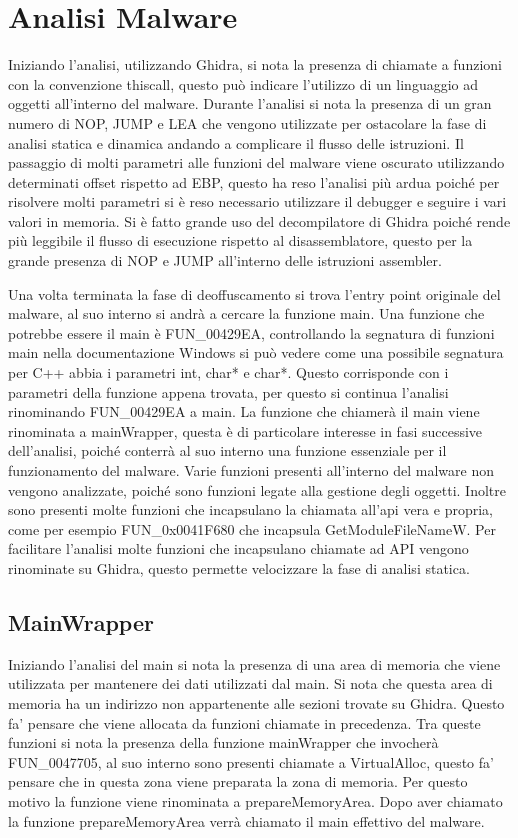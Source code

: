 \documentclass[a4paper,12pt]{article}
\begin{document}
\section{Analisi Malware}
Iniziando l'analisi, utilizzando Ghidra, si nota la presenza di chiamate a funzioni con la convenzione thiscall, questo può indicare l'utilizzo di un linguaggio ad oggetti all'interno del malware. Durante l'analisi si nota la presenza di un gran numero di NOP, JUMP e LEA che vengono utilizzate per ostacolare la fase di analisi statica e dinamica andando a complicare il flusso delle istruzioni. Il passaggio di molti parametri alle funzioni del malware viene oscurato utilizzando determinati offset rispetto ad EBP, questo ha reso l'analisi più ardua poiché per risolvere molti parametri si è reso necessario utilizzare il debugger e seguire i vari valori in memoria. Si è fatto grande uso del decompilatore di Ghidra poiché rende più leggibile il flusso di esecuzione rispetto al disassemblatore, questo per la grande presenza di NOP e JUMP all'interno delle istruzioni assembler.

Una volta terminata la fase di deoffuscamento si trova l'entry point originale del malware, al suo interno si andrà a cercare la funzione main. Una funzione che potrebbe essere il main è FUN\_00429EA, controllando la segnatura di funzioni main nella documentazione Windows si può vedere come una possibile segnatura per C++ abbia i parametri int, char* e char*. Questo corrisponde con i parametri della funzione appena trovata, per questo si continua l'analisi rinominando FUN\_00429EA a main. La funzione che chiamerà il main viene rinominata a mainWrapper, questa è di particolare interesse in fasi successive dell'analisi, poiché conterrà al suo interno una funzione essenziale per il funzionamento del malware. 
 Varie funzioni presenti all'interno del malware non vengono analizzate, poiché sono funzioni legate alla gestione degli oggetti.  Inoltre sono presenti molte funzioni che incapsulano la chiamata all'api vera e propria, come per esempio FUN\_0x0041F680 che incapsula GetModuleFileNameW. Per facilitare l'analisi molte funzioni che incapsulano chiamate ad API vengono rinominate su Ghidra, questo permette velocizzare la fase di analisi statica. 

\subsection{MainWrapper}
Iniziando l'analisi del main si nota la presenza di una area di memoria che viene utilizzata per mantenere dei dati utilizzati dal main. Si nota che questa area di memoria ha un indirizzo non appartenente alle sezioni trovate su Ghidra. Questo fa' pensare che viene allocata da funzioni chiamate in precedenza. Tra queste funzioni si nota la presenza della funzione mainWrapper che invocherà FUN\_0047705, al suo interno sono presenti chiamate a VirtualAlloc, questo fa' pensare che in questa zona viene preparata la zona di memoria. 
Per questo motivo la funzione viene rinominata a prepareMemoryArea. Dopo aver chiamato la funzione prepareMemoryArea verrà chiamato il main effettivo del malware.
\end{document}

